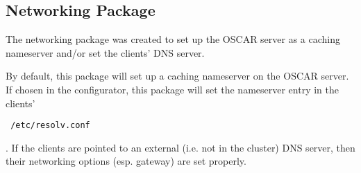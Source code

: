 %
%
%

\subsection{Networking Package}
\label{app:networking-overview}

The networking package was created to set up the OSCAR server as a caching 
nameserver and/or set the clients' DNS server.  

By default, this package will set up a caching nameserver on the OSCAR server.
If chosen in the configurator, this package will set the nameserver entry in
the clients' \begin{verbatim} /etc/resolv.conf \end{verbatim}.  If the clients
are pointed to an external (i.e. not in the cluster) DNS server, then their
networking options (esp. gateway) are set properly.
